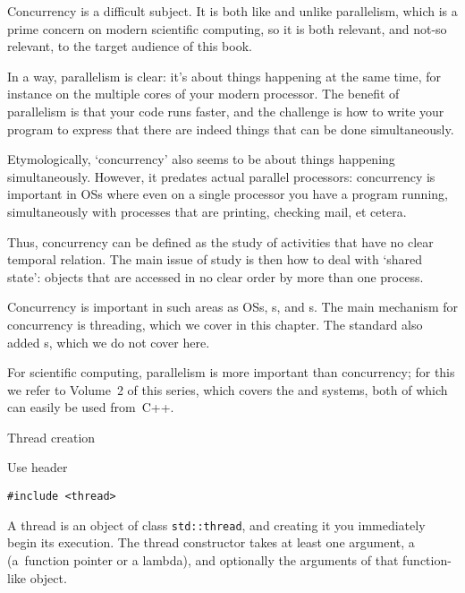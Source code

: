 
Concurrency is a difficult subject.
It is both like and unlike parallelism,
which is a prime concern on modern scientific computing,
so it is both relevant, and not-so relevant,
to the target audience of this book.

In a way, parallelism is clear: it's about things happening at the same time,
for instance on the multiple cores of your modern processor.
The benefit of parallelism is that your code runs faster,
and the challenge is how to write your program
to express that there are indeed things that can be done simultaneously.

Etymologically, `concurrency' also seems to be about things
happening simultaneously. However, it predates actual parallel processors:
concurrency is important in \acp{OS} where even on a single processor
you have a program running, simultaneously with processes that are printing,
checking mail, et cetera.

Thus, concurrency can be defined as the study of activities that have no clear
temporal relation. The main issue of study is then how to deal with `shared state':
objects that are accessed in no clear order by more than one process.

Concurrency is important in such areas as \acp{OS}, s,
and s.
The main mechanism for concurrency is threading, which we cover in this chapter.
The  standard also added s,
which we do not cover here.

For scientific computing, parallelism is more important than concurrency;
for this we refer to Volume~2 of this series,
which covers the  and  systems,
both of which can easily be used from~C++.

 {Thread creation}
\label{sec:cpp-thread}

Use header
\begin{lstlisting}
#include <thread>
\end{lstlisting}

A thread is an object of class \lstinline+std::thread+,
and creating it you immediately begin its execution.
The thread constructor takes at least one argument,
a 
(a~function pointer or a lambda),
and optionally the arguments of that function-like object.

